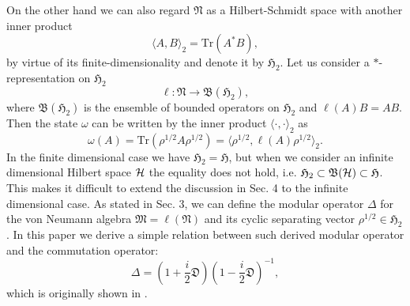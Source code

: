 On the other hand we can also regard $\mathfrak{N}$ as a Hilbert-Schmidt space with another inner product
$$
\langle A, B \rangle_2 =\mbox{Tr}(A^{\ast}B),
$$
by virtue of its finite-dimensionality and denote it by $\mathfrak{H}_2$.
Let us consider a $\ast$-representation on $\mathfrak{H}_2$
\begin{equation}\label{star-rep}
\ell :\mathfrak{N}\to \mathfrak{B}(\mathfrak{H}_2),
\end{equation}
where $\mathfrak{B}(\mathfrak{H}_2)$ is the ensemble of bounded operators on $\mathfrak{H}_2$
and $\ell(A)B=AB$.
Then the state $\omega$ can be written by the inner product $\langle \cdot, \cdot\rangle_2$ as 
$$
\omega(A)=\mbox{Tr}(\rho^{1/2}A\rho^{1/2})=\langle \rho^{1/2},\ell(A)\rho^{1/2}\rangle_2 .
$$
In the finite dimensional case we have $\mathfrak{H}_2=\mathfrak{H}$, but when we consider an infinite
dimensional Hilbert space ${\cal H}$ the equality does not hold, i.e. $\mathfrak{H}_2\subset \mathfrak{B}({\cal H})\subset \mathfrak{H}$. This makes it difficult to extend the discussion in Sec. 4 to the infinite dimensional case.
As stated in Sec. 3, we can define the
modular operator $\Delta$ for the von Neumann algebra $\mathfrak{M}=\ell(\mathfrak{N})$ and its cyclic separating vector $\rho^{1/2} \in \mathfrak{H}_2$. 
In this paper we derive a simple relation between such derived modular operator and the commutation operator:
$$
    \Delta=\left(1+\frac{i}{2}\mathfrak{D}\right)\left(1-\frac{i}{2}\mathfrak{D}\right)^{-1},
$$
which is originally shown in \cite{Holevo_1977}.